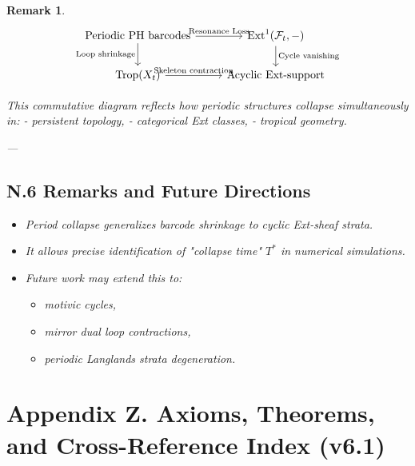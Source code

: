 \documentclass[11pt]{article}
\newtheorem{remark}[theorem]{Remark}
\begin{document}
\begin{remark}
\[
\begin{tikzcd}
\text{Periodic PH barcodes} \arrow[r, "\text{Resonance Loss}"] \arrow[d, "\text{Loop shrinkage}"'] &
\mathrm{Ext}^1(\mathcal{F}_t, -) \arrow[d, "\text{Cycle vanishing}"] \\
\mathrm{Trop}(X_t) \arrow[r, "\text{Skeleton contraction}"] &
\text{Acyclic Ext-support}
\end{tikzcd}
\]

This commutative diagram reflects how periodic structures collapse simultaneously in:
- persistent topology,
- categorical Ext classes,
- tropical geometry.

---

\subsection*{N.6 Remarks and Future Directions}

\begin{itemize}
  \item Period collapse generalizes barcode shrinkage to cyclic Ext-sheaf strata.
  \item It allows precise identification of "collapse time" $T^*$ in numerical simulations.
  \item Future work may extend this to:
    \begin{itemize}
      \item motivic cycles,
      \item mirror dual loop contractions,
      \item periodic Langlands strata degeneration.
    \end{itemize}
\end{itemize}


\section*{Appendix Z. Axioms, Theorems, and Cross-Reference Index (v6.1)}


\end{remark}
\end{document}
